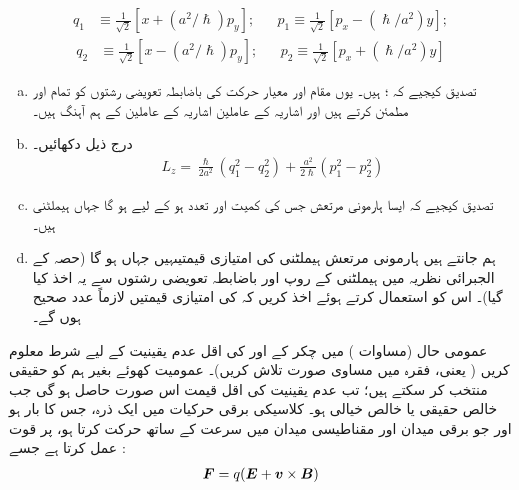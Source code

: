 \begin{align*}
 q_1&\equiv \frac{1}{\sqrt{2}}[x+(a^2/\hslash)p_y]; && p_1\equiv\frac{1}{\sqrt{2}}[p_x-(\hslash/a^2)y];
\end{align*}
\begin{align*}
 q_2&\equiv\frac{1}{\sqrt{2}}[x-(a^2/\hslash)p_y]; &&p_2\equiv\frac{1}{\sqrt{2}}[p_x+(\hslash/a^2)y]
\end{align*}
\begin{enumerate}[a.]
\item
 تصدیق کیجیے کہ ؛  ہیں۔ یوں مقام اور معیار حرکت کی باضابطہ تعویضی  رشتوں کو تمام  اور  مطمئن کرتے ہیں اور اشاریہ  کے عاملین اشاریہ  کے عاملین کے ہم آہنگ ہیں۔
\item
 درج ذیل دکھائیں۔
\begin{align*}
 L_z=\frac{\hslash}{2a^2}(q_1^2-q_2^2)+\frac{a^2}{2\hslash}(p_1^2-p_2^2)
\end{align*}
\item
 تصدیق کیجیے کہ ایسا ہارمونی مرتعش جس کی کمیت  اور تعدد  ہو کے لیے ہو گا جہاں  ہیملٹنی ہیں۔ 
\item
 ہم جانتے ہیں ہارمونی مرتعش ہیملٹنی کی  امتیازی قیمتیںہیں جہاں ہو گا
 (حصہ  کے الجبرائی نظریہ میں ہیملٹنی کے روپ اور
 باضابطہ  تعویضی  رشتوں سے یہ اخذ کیا گیا)۔ اس کو استعمال کرتے ہوئے اخذ کریں کہ  کی  امتیازی قیمتیں لازماً عدد صحیح ہوں گے۔
\end{enumerate}
عمومی حال (مساوات ) میں  چکر کے  اور  کی اقل عدم یقینیت کے لیے شرط معلوم کریں ( یعنی، فقرہ  میں مساوی  صورت تلاش کریں)۔  عمومیت کھوئے بغیر ہم  کو حقیقی منتخب کر سکتے ہیں؛ تب عدم یقینیت کی اقل قیمت اس صورت حاصل ہو گی جب  خالص حقیقی یا خالص خیالی ہو۔
کلاسیکی برقی حرکیات میں ایک ذرہ، جس کا بار  ہو اور جو برقی میدان  اور مقناطیسی میدان  میں سرعت  کے ساتھ حرکت کرتا ہو، پر قوت عمل کرتا ہے جسے :
 \begin{align}
 {\ensuremath{{\boldsymbol{F}}}}=q({{\boldsymbol{E}}}+{{\boldsymbol{v}}}\times{\ensuremath{{\boldsymbol{B}}}})
\end{align}
